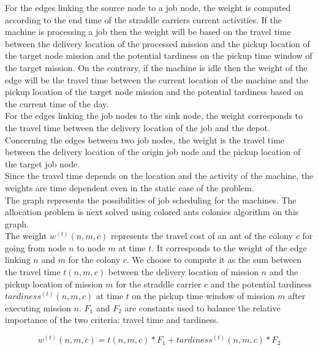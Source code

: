 \documentclass[a4paper,10pt]{article}
\begin{document}
For the edges linking the source node to a job node, the weight is computed according to the end time of the straddle carriers current activities. If the machine is processing a job then the weight will be based on the travel time between the delivery location of the processed mission and the pickup location of the target node mission and the potential tardiness on the pickup time window of the target mission. On the contrary, if the machine is idle then the weight of the edge will be the travel time between the current location of the machine and the pickup location of the target node mission and the potential tardiness based on the current time of the day.\\

For the edges linking the job nodes to the sink node, the weight corresponds to the travel time between the delivery location of the job and the depot.\\

Concerning the edges between two job nodes, the weight is the travel time between the delivery location of the origin job node and the pickup location of the target job node.\\

Since the travel time depends on the location and the activity of the machine, the weights are time dependent even in the static case of the problem.\\

The graph represents the possibilities of job scheduling for the machines. The allocation problem is next solved using colored ants colonies algorithm on this graph.\\

The weight $w^{(t)}(n,m,c)$ represents the travel cost of an ant of the colony $c$ for going from node $n$ to node $m$ at time $t$. It corresponds to the weight of the edge linking $n$ and $m$ for the colony $c$. We choose to compute it as the sum between the travel time $t(n,m,c)$ between the delivery location of mission $n$ and the pickup location of mission $m$ for the straddle carrier $c$ and the potential tardiness $tardiness^{(t)}(n,m,c)$ at time $t$ on the pickup time window of mission $m$ after executing mission $n$. $F_1$ and $F_2$ are constants used to balance the relative importance of the two criteria: travel time and tardiness.

\begin{equation*}
  w^{(t)}(n,m,c) = t(n,m,c)*F_1 + tardiness^{(t)}(n,m,c)*F_2
\end{equation*}
\end{document}
